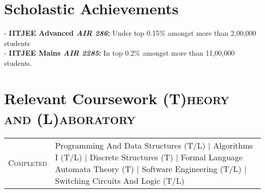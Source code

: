 \documentclass[a4paper,10pt]{extarticle} %
\begin{document}



\vspace{-0.1cm}
\section{\textcolor{primary}{Scholastic Achievements}}

- \textbf{IITJEE Advanced \emph{AIR 286}:} Under top 0.15\% amongst more than 2,00,000 students \\
- \textbf{IITJEE Mains \emph{AIR 2285}:} In top 0.2\% amongst more than 11,00,000 students. \\


\vspace{-0.4cm}
\section{\textcolor{primary}{Relevant Coursework}
\hfill\small\textsc{(T)heory and (L)aboratory}}

\begin{tabular}{r|p{15cm}}
\textsc{Completed} & Programming And Data Structures (T/L) | Algorithms I (T/L) | Discrete Structures (T) | Formal Language Automata Theory (T) | Software Engineering (T/L) | Switching Circuits And Logic (T/L) \\
\end{tabular}

\end{document}
